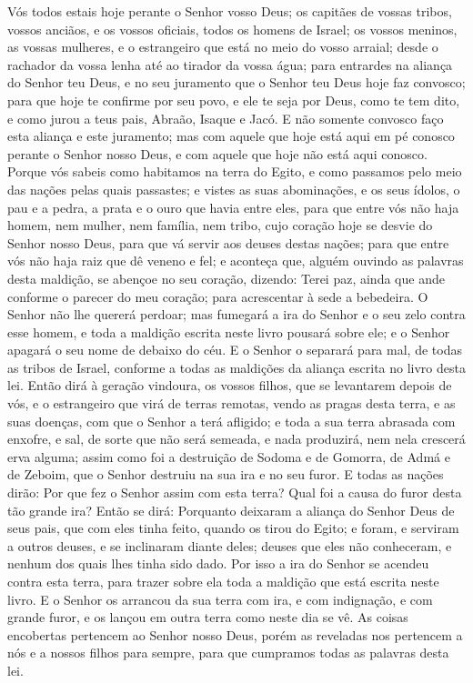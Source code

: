 Vós todos estais hoje perante o Senhor vosso Deus; os capitães de
vossas tribos, vossos anciãos, e os vossos oficiais, todos os homens
de Israel; os vossos meninos, as vossas mulheres, e o
estrangeiro que está no meio do vosso arraial; desde o rachador da
vossa lenha até ao tirador da vossa água; para entrardes na
aliança do Senhor teu Deus, e no seu juramento que o Senhor teu Deus
hoje faz convosco; para que hoje te confirme por seu povo, e
ele te seja por Deus, como te tem dito, e como jurou a teus pais,
Abraão, Isaque e Jacó. E não somente convosco faço esta
aliança e este juramento; mas com aquele que hoje está aqui
em pé conosco perante o Senhor nosso Deus, e com aquele que hoje não
está aqui conosco. Porque vós sabeis como habitamos na terra
do Egito, e como passamos pelo meio das nações pelas quais
passastes; e vistes as suas abominações, e os seus ídolos, o
pau e a pedra, a prata e o ouro que havia entre eles, para
que entre vós não haja homem, nem mulher, nem família, nem tribo,
cujo coração hoje se desvie do Senhor nosso Deus, para que vá servir
aos deuses destas nações; para que entre vós não haja raiz que dê
veneno e fel; e aconteça que, alguém ouvindo as palavras
desta maldição, se abençoe no seu coração, dizendo: Terei paz, ainda
que ande conforme o parecer do meu coração; para acrescentar à sede
a bebedeira. O Senhor não lhe quererá perdoar; mas fumegará a
ira do Senhor e o seu zelo contra esse homem, e toda a maldição
escrita neste livro pousará sobre ele; e o Senhor apagará o seu nome
de debaixo do céu. E o Senhor o separará para mal, de todas
as tribos de Israel, conforme a todas as maldições da aliança
escrita no livro desta lei. Então dirá à geração vindoura, os
vossos filhos, que se levantarem depois de vós, e o estrangeiro que
virá de terras remotas, vendo as pragas desta terra, e as suas
doenças, com que o Senhor a terá afligido; e toda a sua terra
abrasada com enxofre, e sal, de sorte que não será semeada, e nada
produzirá, nem nela crescerá erva alguma; assim como foi a
destruição de Sodoma e de Gomorra, de Admá e de Zeboim, que o Senhor
destruiu na sua ira e no seu furor. E todas as nações dirão:
Por que fez o Senhor assim com esta terra? Qual foi a causa do furor
desta tão grande ira? Então se dirá: Porquanto deixaram a
aliança do Senhor Deus de seus pais, que com eles tinha feito,
quando os tirou do Egito; e foram, e serviram a outros
deuses, e se inclinaram diante deles; deuses que eles não
conheceram, e nenhum dos quais lhes tinha sido dado. Por isso
a ira do Senhor se acendeu contra esta terra, para trazer sobre ela
toda a maldição que está escrita neste livro. E o Senhor os
arrancou da sua terra com ira, e com indignação, e com grande furor,
e os lançou em outra terra como neste dia se vê. As coisas
encobertas pertencem ao Senhor nosso Deus, porém as reveladas nos
pertencem a nós e a nossos filhos para sempre, para que cumpramos
todas as palavras desta lei.

